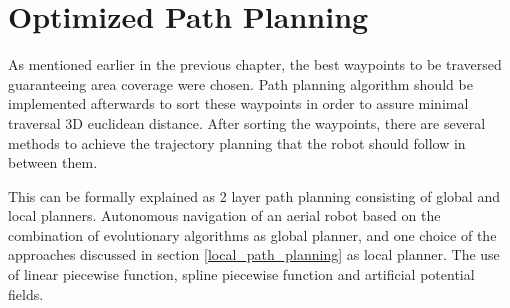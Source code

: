 \chapter{Optimized Path Planning} \label{chap:trial}

As mentioned earlier in the previous chapter, the best waypoints to be traversed guaranteeing area coverage were chosen. Path planning algorithm should be implemented afterwards to sort these waypoints in order to assure minimal traversal 3D euclidean distance. After sorting the waypoints, there are several methods to achieve the trajectory planning that the robot should follow in between them.

This can be formally explained as 2 layer path planning consisting of global and local planners. Autonomous navigation of an aerial robot based on the combination of evolutionary algorithms as global planner, and one choice of the approaches discussed in section \ref{local_path_planning} as local planner. The use of linear piecewise function, spline piecewise function and artificial potential fields.




